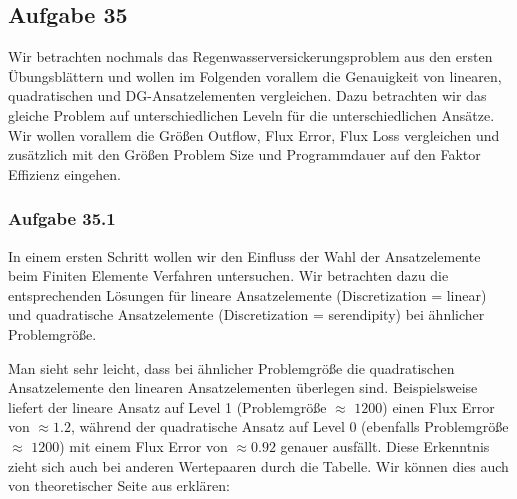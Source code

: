 \subsection{Aufgabe 35}
Wir betrachten nochmals das Regenwasserversickerungsproblem aus den ersten Übungsblättern und wollen im Folgenden vorallem die Genauigkeit von linearen, quadratischen und DG-Ansatzelementen
vergleichen. Dazu betrachten wir das gleiche Problem auf unterschiedlichen Leveln für die unterschiedlichen Ansätze. Wir  wollen vorallem die Größen Outflow, Flux Error, Flux Loss vergleichen und zusätzlich mit den Größen Problem Size und Programmdauer auf den Faktor Effizienz eingehen.

\subsubsection{Aufgabe 35.1}
In einem ersten Schritt wollen wir den Einfluss der Wahl der Ansatzelemente beim Finiten Elemente Verfahren untersuchen.
Wir betrachten dazu die entsprechenden Lösungen für lineare Ansatzelemente (Discretization = linear) und quadratische Ansatzelemente (Discretization = serendipity) bei ähnlicher Problemgröße.
\begin{figure}[H]
	\centering
\end{figure}

\begin{figure}[H]
	\centering
\end{figure}
Man sieht sehr leicht, dass bei ähnlicher Problemgröße die quadratischen Ansatzelemente den linearen Ansatzelementen überlegen sind. Beispielsweise liefert der lineare Ansatz auf Level 1 (Problemgröße $\approx$ $1200$) einen Flux Error von $\approx 1.2$, während der quadratische Ansatz auf Level 0 (ebenfalls Problemgröße $\approx$ $1200$) mit einem Flux Error von $\approx 0.92$ genauer ausfällt. Diese Erkenntnis zieht sich auch bei anderen Wertepaaren durch die Tabelle.
Wir können dies auch von theoretischer Seite aus erklären:

